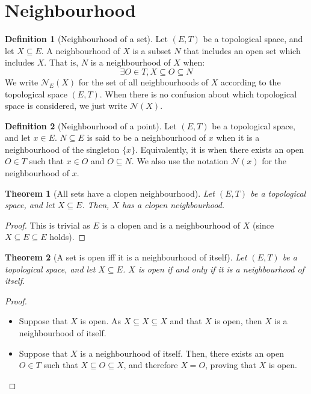\documentclass{article}
\newtheorem{theorem}{Theorem}[section]
\theoremstyle{definition}
\newtheorem{definition}{Definition}[section]
\theoremstyle{remark}
\theoremstyle{example}
\theoremstyle{notation}
\begin{document}
\section{Neighbourhood}

\begin{definition}[Neighbourhood of a set]
		Let $(E, T)$ be a topological space, and let $X \subseteq E$. A neighbourhood of $X$ is a subset $N$ that includes an open set which includes $X$. That is, $N$ is a neighbourhood of $X$ when:
				$$\exists O \in T, X \subseteq O \subseteq N$$
		We write $\mathcal{N}_E(X)$ for the set of all neighbourhoods of $X$ according to the topological space $(E, T)$. When there is no confusion about which topological space is considered, we just write $\mathcal{N}(X)$.
\end{definition}

\begin{definition}[Neighbourhood of a point]
		Let $(E, T)$ be a topological space, and let $x \in E$. $N \subseteq E$ is said to be a neighbourhood of $x$ when it is a neighbourhood of the singleton $\{x\}$. Equivalently, it is when there exists an open $O \in T$ such that $x \in O$ and $O \subseteq N$. We also use the notation $\mathcal{N}(x)$ for the neighbourhood of $x$.
\end{definition}

\begin{theorem}[All sets have a clopen neighbourhood] \label{thm:neighbourhood-existence}
		Let $(E, T)$ be a topological space, and let $X \subseteq E$. Then, $X$ has a clopen neighbourhood.
\end{theorem}

\begin{proof}
		This is trivial as $E$ is a clopen and is a neighbourhood of $X$ (since $X \subseteq E \subseteq E$ holds).
\end{proof}

\begin{theorem}[A set is open iff it is a neighbourhood of itself] \label{thm:open-eq-own-neighbourhood}
		Let $(E, T)$ be a topological space, and let $X \subseteq E$. $X$ is open if and only if it is a neighbourhood of itself.
\end{theorem}

\begin{proof}~
	\begin{itemize}
		\item Suppose that $X$ is open. As $X \subseteq X \subseteq X$ and that $X$ is open, then $X$ is a neighbourhood of itself.
		\item Suppose that $X$ is a neighbourhood of itself. Then, there exists an open $O \in T$ such that $X \subseteq O \subseteq X$, and therefore $X = O$, proving that $X$ is open.
	\end{itemize}
\end{proof}
\end{document}
